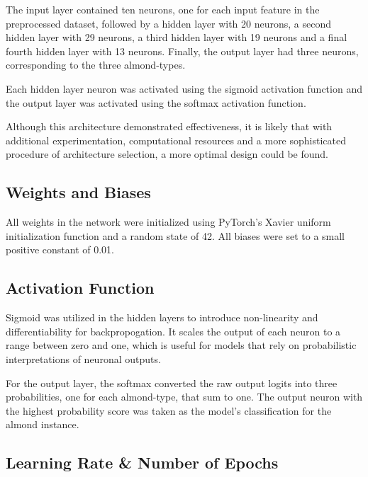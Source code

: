 The input layer contained ten neurons, one for each input feature in the preprocessed 
dataset, followed by a hidden layer with 20 neurons, a second 
hidden layer with 29 neurons, a third hidden layer with 19 neurons and a final
fourth hidden layer with 13 neurons. Finally, the output layer had three
neurons, corresponding to the three almond-types.

Each hidden layer neuron was activated using the sigmoid 
activation function and the output layer was activated using the softmax activation function.

Although this architecture demonstrated 
effectiveness, it is likely that with additional experimentation, computational 
resources and a more sophisticated procedure of architecture selection, 
a more optimal design could be found.

\subsection{Weights and Biases}

All weights in the network were initialized using PyTorch's Xavier uniform initialization function 
and a random state of 42. All biases were set to a small positive constant of 0.01.

\subsection{Activation Function}

Sigmoid was utilized in the hidden layers 
to introduce non-linearity and differentiability for backpropogation. It scales
the output of each neuron to a range between zero and one, which is  
useful for models that rely on probabilistic interpretations of 
neuronal outputs. 

For the output layer, the softmax
converted 
the raw output logits into three probabilities, one for each almond-type, 
that sum to one. The output neuron with the highest probability score was 
taken as the model's classification for the almond instance.

\subsection{Learning Rate \& Number of Epochs}

